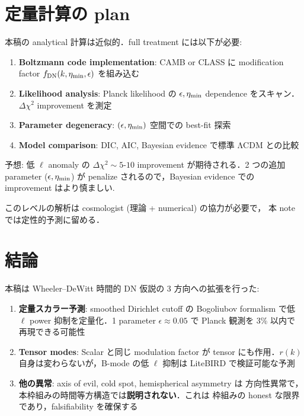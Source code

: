 \documentclass[11pt,a4paper]{article}
\begin{document}
\section{定量計算の plan}\label{sec:future}

本稿の analytical 計算は近似的．full treatment には以下が必要:

\begin{enumerate}
\item \textbf{Boltzmann code implementation}: CAMB or CLASS に
modification factor $f_{\rm DN}(k,\eta_{\rm min},\epsilon)$ を組み込む
\item \textbf{Likelihood analysis}: Planck likelihood の $\epsilon, \eta_{\rm min}$
dependence をスキャン．$\Delta\chi^2$ improvement を測定
\item \textbf{Parameter degeneracy}: $(\epsilon, \eta_{\rm min})$ 空間での
best-fit 探索
\item \textbf{Model comparison}: DIC, AIC, Bayesian evidence で標準
ΛCDM との比較
\end{enumerate}

予想: 低 $\ell$ anomaly の $\Delta\chi^2 \sim 5\text{-}10$ improvement
が期待される．2 つの追加 parameter ($\epsilon, \eta_{\rm min}$) が
penalize されるので，Bayesian evidence での improvement はより慎ましい.

このレベルの解析は cosmologist (理論 + numerical) の協力が必要で，
本 note では定性的予測に留める．

\section{結論}

本稿は Wheeler--DeWitt 時間的 DN 仮説の 3 方向への拡張を行った:

\begin{enumerate}
\item \textbf{定量スカラー予測}: smoothed Dirichlet cutoff の Bogoliubov
formalism で低 $\ell$ power 抑制を定量化．1 parameter $\epsilon \approx 0.05$
で Planck 観測を 3\% 以内で再現できる可能性

\item \textbf{Tensor modes}: Scalar と同じ modulation factor が tensor
にも作用．$r(k)$ 自身は変わらないが，B-mode の低 $\ell$ 抑制は LiteBIRD
で検証可能な予測

\item \textbf{他の異常}: axis of evil, cold spot, hemispherical asymmetry は
方向性異常で，本枠組みの時間等方構造では\textbf{説明されない}．これは
枠組みの honest な限界であり，falsifiability を確保する
\end{enumerate}
\end{document}
